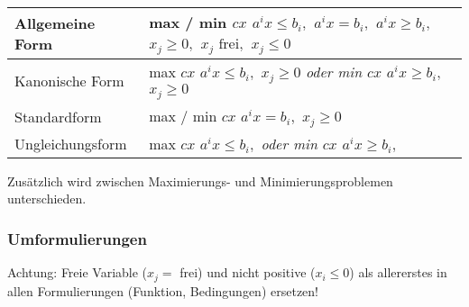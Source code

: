     \begin{tabularx}{\textwidth}{|l|X|}
      \hline
      Allgemeine Form & 
          max / min $cx$ \newline
          $a^ix \leq b_i,$ \newline
          $a^ix = b_i,$ \newline
          $a^ix \geq b_i,$ \newline
          $x_j \geq 0,$ \newline
          $x_j \text{ frei},$ \newline
          $x_j \leq 0$
          \\
      \hline
      Kanonische Form & 
          max $cx$ \newline
          $a^ix \leq b_i,$ \newline
          $x_j \geq 0$ \newline
          \em oder \em\newline
          min $cx$ \newline
          $a^ix \geq b_i,$ \newline
          $x_j \geq 0$
         \\
      \hline
      Standardform & 
        max / min $cx$ \newline
        $a^ix = b_i,$ \newline
        $x_j \geq 0$
        \\
      \hline
      Ungleichungsform & 
        max $cx$ \newline
        $a^ix \leq b_i,$ \newline
        \em oder \em \newline
        min $cx$ \newline
        $a^ix \geq b_i,$
        \\
      \hline
    \end{tabularx}

    Zusätzlich wird zwischen Maximierungs- und Minimierungsproblemen unterschieden.
    
  \subsubsection{Umformulierungen }
    \label{sec:linprog_umwandlungen}
   	Achtung: Freie Variable ($x_j = $ frei) und nicht positive ($x_i \leq 0$) als allererstes in allen Formulierungen (Funktion, Bedingungen) ersetzen!
    	
